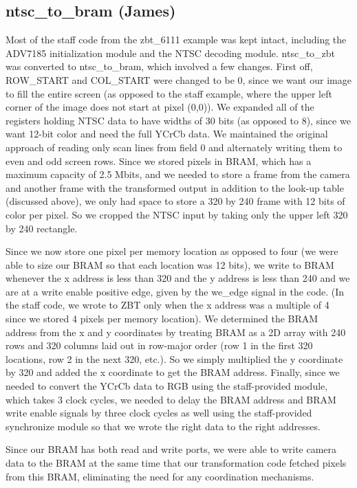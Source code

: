 \documentclass{article}
\begin{document}
\subsection{ntsc\_to\_bram (James)}
Most of the staff code from the zbt\_6111 example was kept intact, including the ADV7185 initialization module and the NTSC decoding module.
ntsc\_to\_zbt was converted to ntsc\_to\_bram, which involved a few changes.
First off, ROW\_START and COL\_START were changed to be 0, since we want our image to fill the entire screen
(as opposed to the staff example, where the upper left corner of the image does not start at pixel (0,0)).
We expanded all of the registers holding NTSC data to have widths of 30 bits (as opposed to 8), since we want 12-bit color and need the full YCrCb data.
We maintained the original approach of reading only scan lines from field 0 and alternately writing them to even and odd screen rows.
Since we stored pixels in BRAM, which has a maximum capacity of 2.5 Mbits,
and we needed to store a frame from the camera and another frame with the transformed output in addition to the look-up table (discussed above),
we only had space to store a 320 by 240 frame with 12 bits of color per pixel.
So we cropped the NTSC input by taking only the upper left 320 by 240 rectangle.

Since we now store one pixel per memory location as opposed to four (we were able to size our BRAM so that each location was 12 bits),
we write to BRAM whenever the x address is less than 320 and the y address is less than 240 and we are at a write enable positive edge,
given by the we\_edge signal in the code.
(In the staff code, we wrote to ZBT only when the x address was a multiple of 4 since we stored 4 pixels per memory location).
We determined the BRAM address from the x and y coordinates by treating BRAM as a 2D array with 240 rows and 320 columns laid out in row-major order (row 1 in the first 320 locations, row 2 in the next 320, etc.).
So we simply multiplied the y coordinate by 320 and added the x coordinate to get the BRAM address.
Finally, since we needed to convert the YCrCb data to RGB using the staff-provided module, which takes 3 clock cycles,
we needed to delay the BRAM address and BRAM write enable signals by three clock cycles as well using the staff-provided synchronize module so that we wrote the right data to the right addresses.

Since our BRAM has both read and write ports, we were able to write camera data to the BRAM at the same time that our transformation code fetched pixels from this BRAM,
eliminating the need for any coordination mechanisms.
\end{document}
